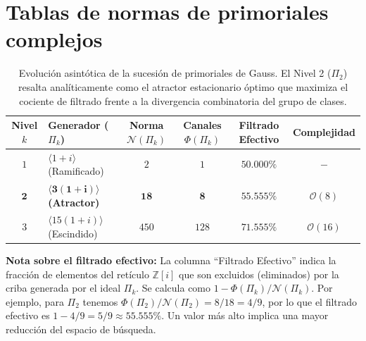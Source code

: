 \documentclass{article}
\numberwithin{equation}{section}
\theoremstyle{plain}
\theoremstyle{definition}
\begin{document}
\appendix

\section{Tablas de normas de primoriales complejos}
\label{apendice:tablas_primoriales}

\begin{table}[h!]
\centering
\renewcommand{\arraystretch}{1.5}
\begin{tabular}{|c|l|c|c|c|c|}
\hline
\textbf{Nivel $k$} & \textbf{Generador ($\Pi_k$)} & \textbf{Norma $\mathcal{N}(\Pi_k)$} & \textbf{Canales $\Phi(\Pi_k)$} & \textbf{Filtrado Efectivo} & \textbf{Complejidad} \\
\hline\hline
$1$ & $\langle 1+i \rangle$ (Ramificado) & $2$ & $1$ & $50.000\%$ & $-$ \\
\hline
$\mathbf{2}$ & $\mathbf{\langle 3(1+i) \rangle}$ \textbf{(Atractor)} & $\mathbf{18}$ & $\mathbf{8}$ & $\mathbf{55.555\%}$ & $\mathcal{O}(8)$ \\
\hline
$3$ & $\langle 15(1+i) \rangle$ (Escindido) & $450$ & $128$ & $71.555\%$ & $\mathcal{O}(16)$ \\
\hline
\end{tabular}
\caption{Evolución asintótica de la sucesión de primoriales de Gauss. El Nivel 2 ($\Pi_2$) resalta analíticamente como el atractor estacionario óptimo que maximiza el cociente de filtrado frente a la divergencia combinatoria del grupo de clases.}
\label{tabla:primoriales_gauss}
\end{table}

\noindent \textbf{Nota sobre el filtrado efectivo:} La columna ``Filtrado Efectivo'' indica la fracción de elementos del retículo $\mathbb{Z}[i]$ que son excluidos (eliminados) por la criba generada por el ideal $\Pi_k$. Se calcula como $1 - \Phi(\Pi_k)/\mathcal{N}(\Pi_k)$. Por ejemplo, para $\Pi_2$ tenemos $\Phi(\Pi_2)/\mathcal{N}(\Pi_2)=8/18=4/9$, por lo que el filtrado efectivo es $1-4/9=5/9\approx 55.555\%$. Un valor más alto implica una mayor reducción del espacio de búsqueda.

\end{document}
